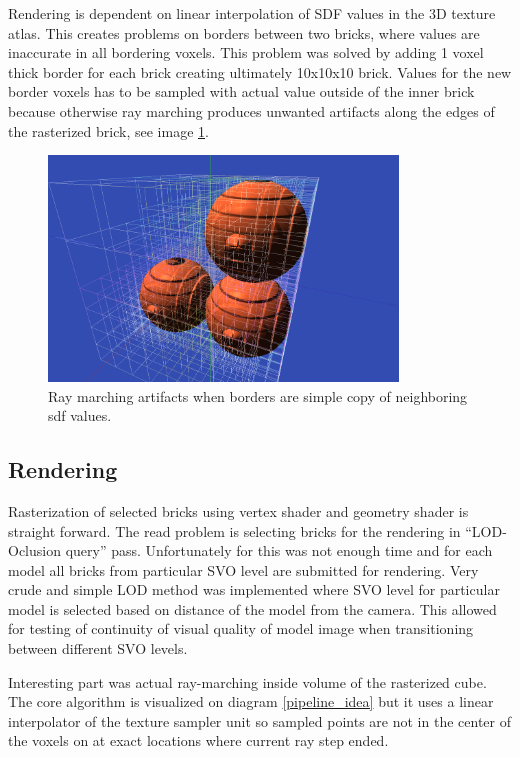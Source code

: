 \documentclass[11pt, a4paper]{article}
\renewcommand{\uv}[1]{``#1''}
\begin{document}
Rendering is dependent on linear interpolation of SDF values in the 3D texture atlas.
This creates problems on borders between two bricks, where values are inaccurate in all bordering voxels.
This problem was solved by adding 1 voxel thick border for each brick creating ultimately 10x10x10 brick.
Values for the new border voxels has to be sampled with actual value outside of the inner brick because otherwise ray marching produces unwanted artifacts along the edges of the rasterized brick, see image \ref{border_artifacts}.
\begin{figure}[ht]
    \centering
    \includegraphics[height=6cm]{marching_artifacts.png}
    \caption{Ray marching artifacts when borders are simple copy of neighboring sdf values.}
    \label{border_artifacts}
\end{figure}

\subsection{Rendering}
Rasterization of selected bricks using vertex shader and geometry shader is straight forward. The read problem is selecting bricks for the rendering in \uv{LOD-Oclusion query} pass. Unfortunately for this was not enough time and for each model all bricks from particular SVO level are submitted for rendering.
Very crude and simple LOD method was implemented where SVO level for particular model is selected based on distance of the model from the camera.
This allowed for testing of continuity of visual quality of model image when transitioning between different SVO levels.

Interesting part was actual ray-marching inside volume of the rasterized cube.
The core algorithm is visualized on diagram \ref{pipeline_idea} but it uses a linear interpolator of the texture sampler unit so sampled points are not in the center of the voxels on at exact locations where current ray step ended.
\end{document}
